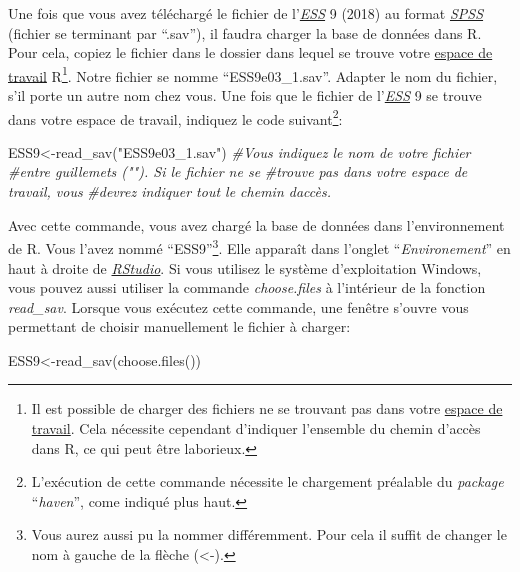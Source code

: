 \documentclass[
]{book}
\newenvironment{Shaded}{\begin{snugshade}}{\end{snugshade}}
\newcommand{\CommentTok}[1]{\textcolor[rgb]{0.56,0.35,0.01}{\textit{#1}}}
\newcommand{\FunctionTok}[1]{\textcolor[rgb]{0.00,0.00,0.00}{#1}}
\newcommand{\NormalTok}[1]{#1}
\newcommand{\OtherTok}[1]{\textcolor[rgb]{0.56,0.35,0.01}{#1}}
\newcommand{\StringTok}[1]{\textcolor[rgb]{0.31,0.60,0.02}{#1}}
\begin{document}
Une fois que vous avez téléchargé le fichier de l'\href{https://www.europeansocialsurvey.org/}{\emph{ESS}} 9 (2018) au format \href{https://www.ibm.com/fr-fr/products/spss-statistics}{\emph{SPSS}} (fichier se terminant par ``.sav''), il faudra charger la base de données dans R. Pour cela, copiez le fichier dans le dossier dans lequel se trouve votre \protect\hyperlink{working_directory}{espace de travail} R\footnote{Il est possible de charger des fichiers ne se trouvant pas dans votre \protect\hyperlink{working_directory}{espace de travail}. Cela nécessite cependant d'indiquer l'ensemble du chemin d'accès dans R, ce qui peut être laborieux.}. Notre fichier se nomme ``ESS9e03\_1.sav''. Adapter le nom du fichier, s'il porte un autre nom chez vous. Une fois que le fichier de l'\href{https://www.europeansocialsurvey.org/}{\emph{ESS}} 9 se trouve dans votre espace de travail, indiquez le code suivant\footnote{L'exécution de cette commande nécessite le chargement préalable du \emph{package} ``\emph{haven}'', come indiqué plus haut.}:

\begin{Shaded}
\begin{Highlighting}[]
\NormalTok{ESS9}\OtherTok{\textless{}{-}}\FunctionTok{read\_sav}\NormalTok{(}\StringTok{"ESS9e03\_1.sav"}\NormalTok{) }\CommentTok{\#Vous indiquez le nom de votre fichier}
                      \CommentTok{\#entre guillemets (""). Si le fichier ne se}
                      \CommentTok{\#trouve pas dans votre espace de travail, vous}
                      \CommentTok{\#devrez indiquer tout le chemin d\textquotesingle{}accès.}
\end{Highlighting}
\end{Shaded}

Avec cette commande, vous avez chargé la base de données dans l'environnement de R. Vous l'avez nommé ``ESS9''\footnote{Vous aurez aussi pu la nommer différemment. Pour cela il suffit de changer le nom à gauche de la flèche (\textless-).}. Elle apparaît dans l'onglet ``\emph{Environement}'' en haut à droite de \href{https://posit.co/}{\emph{RStudio}}. Si vous utilisez le système d'exploitation Windows, vous pouvez aussi utiliser la commande \emph{choose.files} à l'intérieur de la fonction \emph{read\_sav}. Lorsque vous exécutez cette commande, une fenêtre s'ouvre vous permettant de choisir manuellement le fichier à charger:

\begin{Shaded}
\begin{Highlighting}[]
\NormalTok{ESS9}\OtherTok{\textless{}{-}}\FunctionTok{read\_sav}\NormalTok{(}\FunctionTok{choose.files}\NormalTok{())}
\end{Highlighting}
\end{Shaded}
\end{document}
